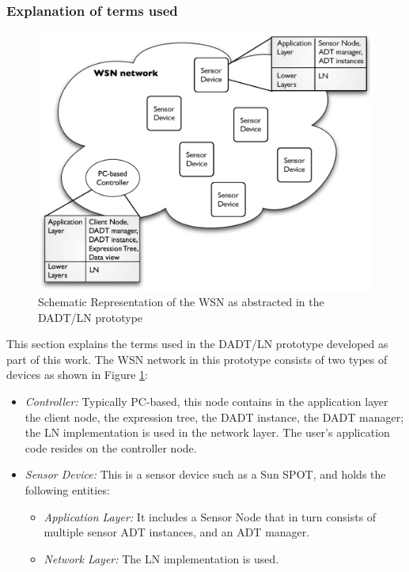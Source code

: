 \subsubsection{Explanation of terms used}

\begin{figure}
\centering
\includegraphics[scale=0.55]{img/DADTLN_glossary.eps} 
\caption[WSN in DADT/LN prototype]{Schematic Representation of the WSN as abstracted in the DADT/LN prototype}
\label{Fig:DADTLN_glossary}
\end{figure} 

This section explains the terms used in the DADT/LN prototype developed as part
of this work. The WSN network in this prototype consists of two types of
devices as shown in Figure \ref{Fig:DADTLN_glossary}: 
\begin{itemize}
  \item \emph{Controller:} Typically PC-based, this node contains in the
  application layer the client node, the expression tree, the DADT instance, the
  DADT manager; the LN
  implementation is used in the network layer. The user's application code resides on
  the controller node.
  \item \emph{Sensor Device:} This is a sensor device such as a Sun SPOT, and
  holds the following entities:
  \begin{itemize}
    \item \emph{Application Layer:} It includes a Sensor Node that in turn
    consists of multiple sensor ADT instances, and an ADT manager.
    \item \emph{Network Layer:} The LN implementation is used.
  \end{itemize}
\end{itemize}

